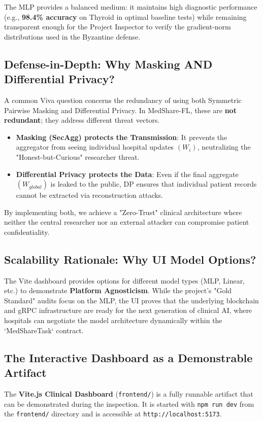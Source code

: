 \documentclass[10pt, a4paper, twocolumn]{article}
\begin{document}
The MLP provides a balanced medium: it maintains high diagnostic performance (e.g., \textbf{98.4\% accuracy} on Thyroid in optimal baseline tests) while remaining transparent enough for the Project Inspector to verify the gradient-norm distributions used in the Byzantine defense.

\subsection{Defense-in-Depth: Why Masking AND Differential Privacy?}
A common Viva question concerns the redundancy of using both Symmetric Pairwise Masking and Differential Privacy. In MedShare-FL, these are \textbf{not redundant}; they address different threat vectors.

\begin{itemize}
    \item \textbf{Masking (SecAgg) protects the Transmission}: It prevents the aggregator from seeing individual hospital updates $(W_i)$, neutralizing the "Honest-but-Curious" researcher threat.
    \item \textbf{Differential Privacy protects the Data}: Even if the final aggregate $(W_{global})$ is leaked to the public, DP ensures that individual patient records cannot be extracted via reconstruction attacks.
\end{itemize}

By implementing both, we achieve a "Zero-Trust" clinical architecture where neither the central researcher nor an external attacker can compromise patient confidentiality.

\subsection{Scalability Rationale: Why UI Model Options?}
The Vite dashboard provides options for different model types (MLP, Linear, etc.) to demonstrate \textbf{Platform Agnosticism}. While the project's "Gold Standard" audits focus on the MLP, the UI proves that the underlying blockchain and gRPC infrastructure are ready for the next generation of clinical AI, where hospitals can negotiate the model architecture dynamically within the `MedShareTask` contract.

\subsection{The Interactive Dashboard as a Demonstrable Artifact}
The \textbf{Vite.js Clinical Dashboard} (\texttt{frontend/}) is a fully runnable artifact that can be demonstrated during the inspection. It is started with \texttt{npm run dev} from the \texttt{frontend/} directory and is accessible at \texttt{http://localhost:5173}.
\end{document}
